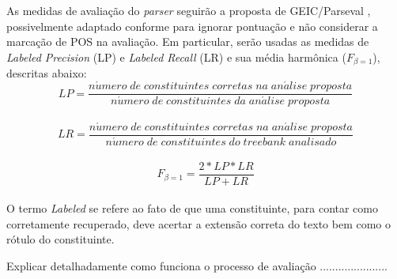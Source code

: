 As medidas de avaliação do \emph{parser} seguirão a proposta de GEIC/Parseval \cite{black91}, possivelmente adaptado conforme \cite{collins97} para ignorar pontuação e não considerar a marcação de POS na avaliação. Em particular, serão usadas as medidas de \emph{Labeled Precision} (LP) e \emph{Labeled Recall} (LR) e sua média harmônica ($F_{\beta=1}$), descritas abaixo:
\\
$$LP = \frac{n\acute{u}mero\; de\; constituintes\; corretas\; na\; an\acute{a}lise\; proposta}{n\acute{u}mero\; de\; constituintes\; da\; an\acute{a}lise\; proposta}$$
\\
$$LR = \frac{n\acute{u}mero\; de\; constituintes\; corretas\; na\; an\acute{a}lise\; proposta}{n\acute{u}mero\; de\; constituintes\; do\; \mathit{treebank}\; analisado}$$
\\
$$F_{\beta=1} = \frac{2*LP*LR}{LP+LR}$$
\\
O termo \emph{Labeled} se refere ao fato de que uma constituinte, para contar como corretamente recuperado, deve acertar a extensão correta do texto bem como o rótulo do constituinte.



Explicar detalhadamente como funciona o processo de avaliação  ......................
